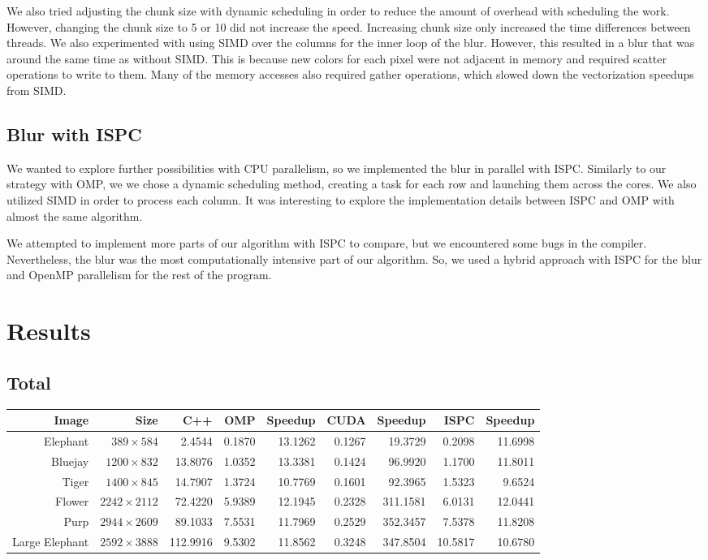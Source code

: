 \documentclass[12pt]{article}
\begin{document}
We also tried adjusting the chunk size with dynamic scheduling in order to
reduce the amount of overhead with scheduling the work. However, changing the
chunk size to 5 or 10 did not increase the speed. Increasing chunk size only
increased the time differences between threads. We also experimented with using
SIMD over the columns for the inner loop of the blur. However, this resulted in
a blur that was around the same time as without SIMD. This is because new
colors for each pixel were not adjacent in memory and required scatter
operations to write to them. Many of the memory accesses also required gather
operations, which slowed down the vectorization speedups from SIMD.

\subsection{Blur with ISPC}
We wanted to explore further possibilities with CPU parallelism, so we
implemented the blur in parallel with ISPC. Similarly to our strategy with OMP,
we we chose a dynamic scheduling method, creating a task for each row and
launching them across the cores. We also utilized SIMD in order to process each
column. It was interesting to explore the implementation details between ISPC
and OMP with almost the same algorithm.

We attempted to implement more parts of our algorithm with ISPC to compare, but
we encountered some bugs in the compiler. Nevertheless, the blur was the
most computationally intensive part of our algorithm. So, we used a hybrid
approach with ISPC for the blur and OpenMP parallelism for the rest of the
program.

\section{Results}

\subsection{Total}
\begin{tabular}{r|r|r|r|r|r|r|r|r}
    Image & Size & C++ & OMP & Speedup & CUDA & Speedup & ISPC & Speedup
\\  \hline
    Elephant & $389 \times 584$ & 2.4544 & 0.1870 & 13.1262 & 0.1267 & 19.3729 & 0.2098 & 11.6998
\\  Bluejay & $1200 \times 832$ & 13.8076 & 1.0352 & 13.3381 & 0.1424 & 96.9920 & 1.1700 & 11.8011
\\  Tiger & $1400 \times 845$ & 14.7907 & 1.3724 & 10.7769 & 0.1601 & 92.3965 & 1.5323 & 9.6524
\\  Flower & $2242 \times 2112$ & 72.4220 & 5.9389 & 12.1945 & 0.2328 & 311.1581 & 6.0131 & 12.0441
\\  Purp & $2944 \times 2609$ & 89.1033 & 7.5531 & 11.7969 & 0.2529 & 352.3457 & 7.5378 & 11.8208
\\  Large Elephant & $2592 \times 3888$ & 112.9916 & 9.5302 & 11.8562 & 0.3248 & 347.8504 & 10.5817 & 10.6780
\end{tabular}
\end{document}
